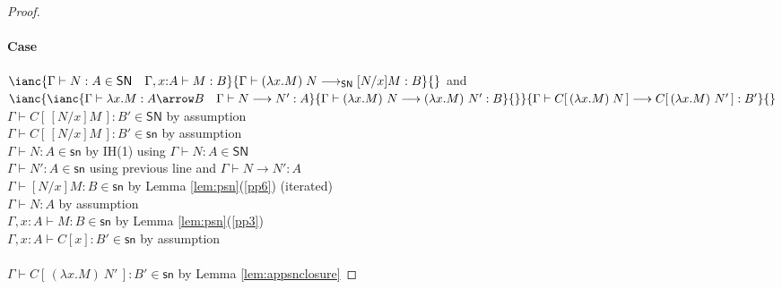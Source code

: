 \documentclass{article}
\newcommand{\SN}{\mathsf{SN}}
\newcommand{\csn}{\mathsf{sn}}
\newcommand{\red}{\longrightarrow}
\newcommand{\redSN}{\longrightarrow_\SN}
\begin{document}
\begin{proof}
\paragraph{Case} $\ianc{\Gamma \vdash N : A \in \SN \quad \Gamma, x{:}A \vdash M : B}
                       {\Gamma \vdash (\lambda x.M)\;N \redSN [N/x]M : B}{}$
\qquad and \qquad$
             \ianc{     
                   \ianc{\Gamma \vdash \lambda x.M : A \arrow B \quad \Gamma \vdash N \red N' : A}
                        {\Gamma \vdash (\lambda x.M)~N \red (\lambda x.M)~N' : B}{}}
                  {\Gamma \vdash C[\,(\lambda x.M)\;N\,] \red C[\, (\lambda x.M)~N' \,] : B'}{}
$
\\[1em]
$\Gamma \vdash C[\,[N/x]M\,] : B' \in \SN$ \hfill by assumption \\
$\Gamma \vdash C[\,[N/x]M\,] : B' \in \csn$ \hfill by assumption \\
$\Gamma \vdash N : A \in \csn$ \hfill by IH(1) using $\Gamma \vdash N : A \in \SN$\\
$\Gamma \vdash N' : A \in \csn$ \hfill using previous line and $\Gamma \vdash N \red N' : A$\\
$\Gamma \vdash [N/x]M : B \in \csn$ \hfill by  Lemma \ref{lem:psn}(\ref{pp6}) (iterated)\\
$\Gamma \vdash N : A$ \hfill by assumption \\
$\Gamma,x{:}A \vdash M : B \in \csn$ \hfill by Lemma \ref{lem:psn}(\ref{pp3}) \\ 
$\Gamma, x{:}A \vdash C[x] : B' \in \csn$ \hfill by assumption \\
{\color{red}{$\Gamma \vdash [N'/x]M : B \in \csn$ \hfill ??}}\\
$\Gamma \vdash C[\,(\lambda x.M)~N'\,] : B' \in \csn$ \hfill by Lemma \ref{lem:appsnclosure}

%

\end{proof}
\end{document}
